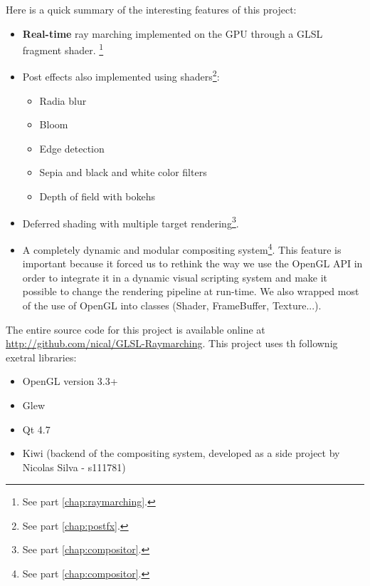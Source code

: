     Here is a quick summary of the interesting features of this project:
    \begin{itemize}
        \item \textbf{Real-time} ray marching implemented on the GPU through a GLSL fragment shader. \footnote{See part \ref{chap:raymarching}.}
        \item Post effects also implemented using shaders\footnote{See part \ref{chap:postfx}.}:
        \begin{itemize}
            \item Radia blur
            \item Bloom
            \item Edge detection
            \item Sepia and black and white color filters
            \item Depth of field with bokehs
        \end{itemize}
        \item Deferred shading with multiple target rendering\footnote{See part \ref{chap:compositor}.}. 
        \item A completely dynamic and modular compositing system\footnote{See part \ref{chap:compositor}.}. This feature is
        important because it forced us to rethink the way we use the OpenGL API
        in order to integrate it in a dynamic visual scripting system and make it
        possible to change the rendering pipeline at run-time. We also wrapped
        most of the use of OpenGL into classes (Shader, FrameBuffer, Texture...).
    \end{itemize}

\vspace{1cm}

The entire source code for this project is available online at \url{http://github.com/nical/GLSL-Raymarching}.
This project uses th follownig exetral libraries:
\begin{itemize}
    \item OpenGL version 3.3+
    \item Glew
    \item Qt 4.7
    \item Kiwi (backend of the compositing system, developed as a side project by Nicolas Silva - s111781)
\end{itemize}
